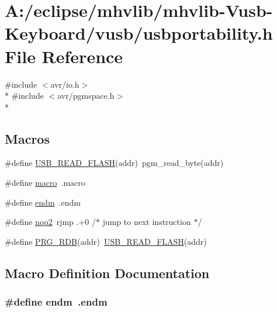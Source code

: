 \hypertarget{mhvlib-_vusb-_keyboard_2vusb_2usbportability_8h}{\section{A\-:/eclipse/mhvlib/mhvlib-\/\-Vusb-\/\-Keyboard/vusb/usbportability.h File Reference}
\label{mhvlib-_vusb-_keyboard_2vusb_2usbportability_8h}
}
{\ttfamily \#include $<$avr/io.\-h$>$}\\*
{\ttfamily \#include $<$avr/pgmspace.\-h$>$}\\*
\subsection*{Macros}
\begin{DoxyCompactItemize}
\item 
\#define \hyperlink{mhvlib-_vusb-_keyboard_2vusb_2usbportability_8h_a078882d037ab92d73cc70b97738d552d}{U\-S\-B\-\_\-\-R\-E\-A\-D\-\_\-\-F\-L\-A\-S\-H}(addr)~pgm\-\_\-read\-\_\-byte(addr)
\item 
\#define \hyperlink{mhvlib-_vusb-_keyboard_2vusb_2usbportability_8h_a27188a3f4bdad4750865cc4b0d001559}{macro}~.macro
\item 
\#define \hyperlink{mhvlib-_vusb-_keyboard_2vusb_2usbportability_8h_a42431a55be9ecfc03292cc1601e5c4d9}{endm}~.endm
\item 
\#define \hyperlink{mhvlib-_vusb-_keyboard_2vusb_2usbportability_8h_a62df5117c12fbb897e5d6956620d794b}{nop2}~rjmp    .+0 /$\ast$ jump to next instruction $\ast$/
\item 
\#define \hyperlink{mhvlib-_vusb-_keyboard_2vusb_2usbportability_8h_af7c7b7892c3be6693e9107a0b4e1a75e}{P\-R\-G\-\_\-\-R\-D\-B}(addr)~\hyperlink{mhvlib-_vusb-_console_2vusb_2usbportability_8h_a078882d037ab92d73cc70b97738d552d}{U\-S\-B\-\_\-\-R\-E\-A\-D\-\_\-\-F\-L\-A\-S\-H}(addr)
\end{DoxyCompactItemize}


\subsection{Macro Definition Documentation}
\hypertarget{mhvlib-_vusb-_keyboard_2vusb_2usbportability_8h_a42431a55be9ecfc03292cc1601e5c4d9}{
\subsubsection[{endm}]{\setlength{\rightskip}{0pt plus 5cm}\#define endm~.endm}}\label{mhvlib-_vusb-_keyboard_2vusb_2usbportability_8h_a42431a55be9ecfc03292cc1601e5c4d9}


